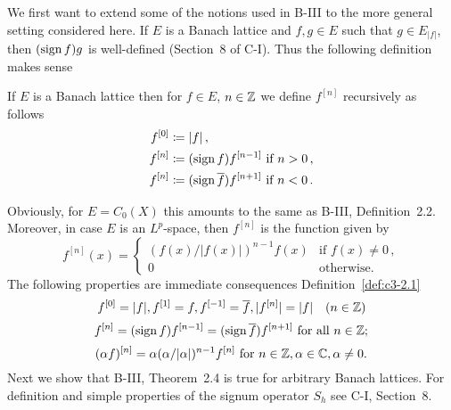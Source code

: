 We first want to extend some of the notions used in B-III to the more general setting considered here.
If $E$ is a Banach lattice and $f,g \in E$ such that $g \in E_{|f|}$, then $(\operatorname{sign}  f)g$ is well-defined (\cf Section~8 of C-I).
Thus the following definition makes sense
\begin{definition}\label{def:c3-2.1}
	If $E$ is a Banach lattice then for $f \in E$, $n \in \mathbb{Z}$ we define $f^{[n]}$ recursively as follows
	\begin{equation}\label{eq:c3-2.1}
	\begin{aligned}
		f^{[0]} &\coloneqq |f|\,, \\
		f^{[n]} &\coloneqq (\operatorname{sign}  f)f^{[n-1]} \text{ if } n > 0\,,\\
		f^{[n]} &\coloneqq (\operatorname{sign}  \overline{f})f^{[n+1]} \text{ if } n < 0\,.
	\end{aligned}
	\end{equation}
\end{definition}
Obviously, for $E = C_{0}(X)$ this amounts to the same as B-III, Definition~2.2.
Moreover, in case $E$ is an $L^p$-space, then $f^{[n]}$ is the function given by
\begin{equation}\label{eq:c3-2.2}
	f^{[n]}(x) = \begin{cases}
		(f(x)/|f(x)|)^{n-1}f(x) & \text{if } f(x) \neq 0\,, \\
		0 & \text{otherwise}.
	\end{cases}
\end{equation}
The following properties are immediate consequences Definition~\ref{def:c3-2.1}
\begin{equation}\label{eq:c3-2.3}
	f^{[0]} = |f|, f^{[1]} = f, f^{[-1]} = \overline{f}, |f^{[n]}| = |f| \quad (n \in \mathbb{Z})
\end{equation}
\begin{equation}\label{eq:c3-2.4}
	f^{[n]} = (\operatorname{sign}  f)f^{[n-1]} = (\operatorname{sign}  \overline{f})f^{[n+1]} \text{ for all } n \in \mathbb{Z};
\end{equation}
\begin{equation}\label{eq:c3-2.5}
	(\alpha f)^{[n]} = \alpha(\alpha/|\alpha|)^{n-1}f^{[n]} \text{ for } n \in \mathbb{Z}, \alpha \in \mathbb{C} , \alpha \neq 0.
\end{equation}
Next we show that B-III, Theorem~2.4 is true for arbitrary Banach lattices.
For definition and simple properties of the signum operator $S_{h}$ see C-I, Section~8.

